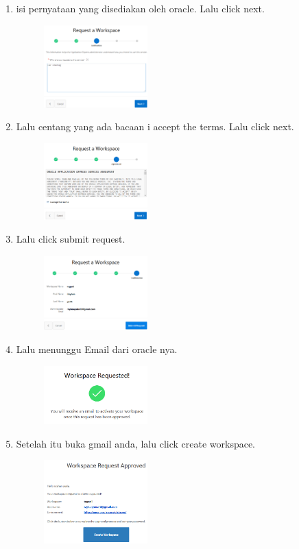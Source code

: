 \documentclass[a4paper,12pt]{report}
\begin{document}
\begin{enumerate}
\item
isi pernyataan yang disediakan oleh oracle. Lalu click next.
\begin{figure}[h]
\includegraphics[width=4cm]{gambar/5.png}
\end{figure}

\newpage
\item
Lalu centang yang ada bacaan i accept the terms. Lalu click next.
\begin{figure}[h]
\includegraphics[width=4cm]{gambar/6.png}
\end{figure}


\item
Lalu click submit request.
\begin{figure}[h]
\includegraphics[width=4cm]{gambar/7.png}
\end{figure}

\item 
Lalu menunggu Email dari oracle nya.
\begin{figure}[h]
\includegraphics[width=4cm]{gambar/8.png}
\end{figure}

\newpage
\item
Setelah itu buka gmail anda, lalu click create workspace.
\begin{figure}[h]
\includegraphics[width=4cm]{gambar/9.png}
\end{figure}


\end{enumerate}
\end{document}
